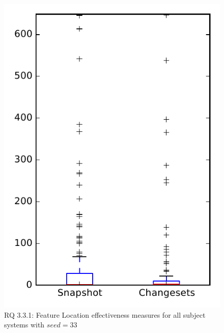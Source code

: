 
\begin{figure}
\centering
\includegraphics[height=0.4\textheight]{figures/flt_seed/rq1_overview_33}
\caption{RQ 3.3.1: Feature Location effectiveness measures for all subject systems with $seed=33$}
\label{fig:flt_seed:rq1:overview}
\end{figure}

